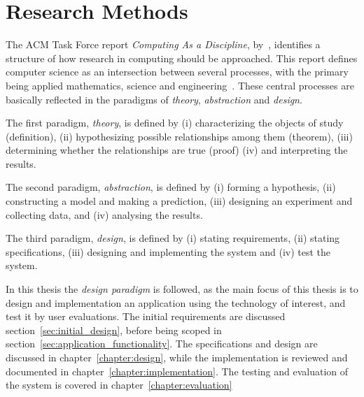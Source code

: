 \section{Research Methods}
The ACM Task Force report \textit{Computing As a Discipline}, by~\citet{Denning1989}, identifies a structure of how research in computing should be approached.
This report defines computer science as an intersection between several processes, with the primary being applied mathematics, science and engineering~\citep{Denning1989}.
These central processes are basically reflected in the paradigms of \textit{theory}, \textit{abstraction} and \textit{design}.

The first paradigm, \textit{theory}, is defined by (i) characterizing the objects of study (definition), (ii) hypothesizing possible relationships among them (theorem), (iii) 
determining whether the relationships are true (proof) (iv) and interpreting the results.

The second paradigm, \textit{abstraction}, is defined by (i) forming a hypothesis, (ii) constructing a model and making a prediction, (iii) designing an experiment and collecting data, 
and (iv) analysing the results. 

The third paradigm, \textit{design}, is defined by (i) stating requirements, (ii) stating specifications, (iii) designing and implementing the system and (iv) test the system.


In this thesis the \textit{design paradigm} is followed, as the main focus of this thesis is to design and implementation an application using the technology of interest,
and test it by user evaluations. The initial requirements are discussed section~\vref{sec:initial_design}, before being scoped in section~\vref{sec:application_functionality}. 
The specifications and design are discussed in chapter~\vref{chapter:design}, while the implementation is reviewed and documented in chapter~\vref{chapter:implementation}. 
The testing and evaluation of the system is covered in chapter~\vref{chapter:evaluation}


